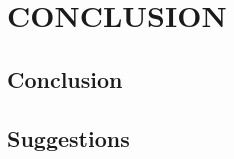 \chapter{CONCLUSION}
\setlength{\leftskip}{0.7cm}
	\section{Conclusion}
	\lipsum[2]
	
	\section{Suggestions}
	\lipsum[2]